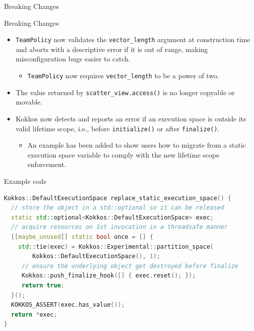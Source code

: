 
\begin{frame}[fragile]

  {\Huge Breaking Changes}

  \vspace{10pt}

\end{frame}




\begin{frame}[fragile]{Breaking Changes}
 \begin{itemize}
   \item \texttt{TeamPolicy} now validates the \texttt{vector\_length} argument at construction time and aborts with a descriptive error if it is out of range, making misconfiguration bugs easier to catch.
     \begin{itemize}
       \item \texttt{TeamPolicy} now requires \texttt{vector\_length} to be a power of two.
     \end{itemize}
   \item The value returned by \texttt{scatter\_view.access()} is no longer copyable or movable.
   \item Kokkos now detects and reports an error if an execution space is outside its valid lifetime scope, i.e., before \texttt{initialize()} or after \texttt{finalize()}.
     \begin{itemize}
      \item An example has been added to show users how to migrate from a static execution space variable to comply with the new lifetime scope enforcement.
     \end{itemize}
 \end{itemize}
\end{frame}


\begin{frame}[fragile]{Example code}
   \begin{lstlisting}[language=c++]
Kokkos::DefaultExecutionSpace replace_static_execution_space() {
  // store the object in a std::optional so it can be released
  static std::optional<Kokkos::DefaultExecutionSpace> exec;
  // acquire resources on 1st invocation in a threadsafe manner
  [[maybe_unused]] static bool once = [] {
    std::tie(exec) = Kokkos::Experimental::partition_space(
        Kokkos::DefaultExecutionSpace(), 1);
     // ensure the underlying object get destroyed before finalize
     Kokkos::push_finalize_hook([] { exec.reset(); });
     return true;
  }();
  KOKKOS_ASSERT(exec.has_value());
  return *exec;
}
   \end{lstlisting}
\end{frame}

